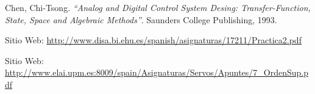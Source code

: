 \documentclass[twocolumn]{IEEEtran}
\begin{document}

\begin{thebibliography}{99}

 Chen, Chi-Tsong.
{\em "`Analog and Digital Control System Desing: Transfer-Function, State, Space and Algebraic Methods"'}.
Saunders College Publishing, 1993.

 Sitio Web: \url{http://www.disa.bi.ehu.es/spanish/asignaturas/17211/Practica2.pdf}

 Sitio Web: \url{http://www.elai.upm.es:8009/spain/Asignaturas/Servos/Apuntes/7_OrdenSup.pdf}

\end{thebibliography}
\end{document}
